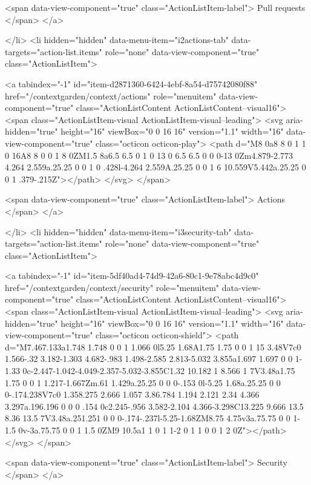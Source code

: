         <span data-view-component="true" class="ActionListItem-label">
          Pull requests
</span>      
</a>
  
</li>
        <li hidden="hidden" data-menu-item="i2actions-tab" data-targets="action-list.items" role="none" data-view-component="true" class="ActionListItem">
    
    
    <a tabindex="-1" id="item-d2871360-6424-4ebf-8a54-d75742080f88" href="/contextgarden/context/actions" role="menuitem" data-view-component="true" class="ActionListContent ActionListContent--visual16">
        <span class="ActionListItem-visual ActionListItem-visual--leading">
          <svg aria-hidden="true" height="16" viewBox="0 0 16 16" version="1.1" width="16" data-view-component="true" class="octicon octicon-play">
    <path d="M8 0a8 8 0 1 1 0 16A8 8 0 0 1 8 0ZM1.5 8a6.5 6.5 0 1 0 13 0 6.5 6.5 0 0 0-13 0Zm4.879-2.773 4.264 2.559a.25.25 0 0 1 0 .428l-4.264 2.559A.25.25 0 0 1 6 10.559V5.442a.25.25 0 0 1 .379-.215Z"></path>
</svg>
        </span>
      
        <span data-view-component="true" class="ActionListItem-label">
          Actions
</span>      
</a>
  
</li>
        <li hidden="hidden" data-menu-item="i3security-tab" data-targets="action-list.items" role="none" data-view-component="true" class="ActionListItem">
    
    
    <a tabindex="-1" id="item-5df40ad4-74d9-42a6-80c1-9e78abc4d9c0" href="/contextgarden/context/security" role="menuitem" data-view-component="true" class="ActionListContent ActionListContent--visual16">
        <span class="ActionListItem-visual ActionListItem-visual--leading">
          <svg aria-hidden="true" height="16" viewBox="0 0 16 16" version="1.1" width="16" data-view-component="true" class="octicon octicon-shield">
    <path d="M7.467.133a1.748 1.748 0 0 1 1.066 0l5.25 1.68A1.75 1.75 0 0 1 15 3.48V7c0 1.566-.32 3.182-1.303 4.682-.983 1.498-2.585 2.813-5.032 3.855a1.697 1.697 0 0 1-1.33 0c-2.447-1.042-4.049-2.357-5.032-3.855C1.32 10.182 1 8.566 1 7V3.48a1.75 1.75 0 0 1 1.217-1.667Zm.61 1.429a.25.25 0 0 0-.153 0l-5.25 1.68a.25.25 0 0 0-.174.238V7c0 1.358.275 2.666 1.057 3.86.784 1.194 2.121 2.34 4.366 3.297a.196.196 0 0 0 .154 0c2.245-.956 3.582-2.104 4.366-3.298C13.225 9.666 13.5 8.36 13.5 7V3.48a.251.251 0 0 0-.174-.237l-5.25-1.68ZM8.75 4.75v3a.75.75 0 0 1-1.5 0v-3a.75.75 0 0 1 1.5 0ZM9 10.5a1 1 0 1 1-2 0 1 1 0 0 1 2 0Z"></path>
</svg>
        </span>
      
        <span data-view-component="true" class="ActionListItem-label">
          Security
</span>      
</a>
  
